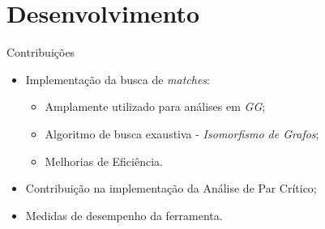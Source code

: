 \documentclass[xcolor=dvipsnames,pdf,10pt]{beamer}
\newcommand{\bi}{\begin{itemize}}
\newcommand{\ei}{\end{itemize}}
\newcommand{\tm}{\item}
\begin{document}

\section{Desenvolvimento}

\begin{frame}{Contribuições}

\bi
   \tm Implementação da busca de \emph{matches}:
        \bi
            \tm Amplamente utilizado para análises em \emph{GG};
            \tm Algoritmo de busca exaustiva - \emph{Isomorfismo de Grafos};
            \tm Melhorias de Eficiência.
        \ei 
        
    \vspace{0.25cm}
    \tm Contribuição na implementação da Análise de Par Crítico;
    
    \vspace{0.25cm}    
    \tm Medidas de desempenho da ferramenta.
    
\ei
\end{frame}
\end{document}

